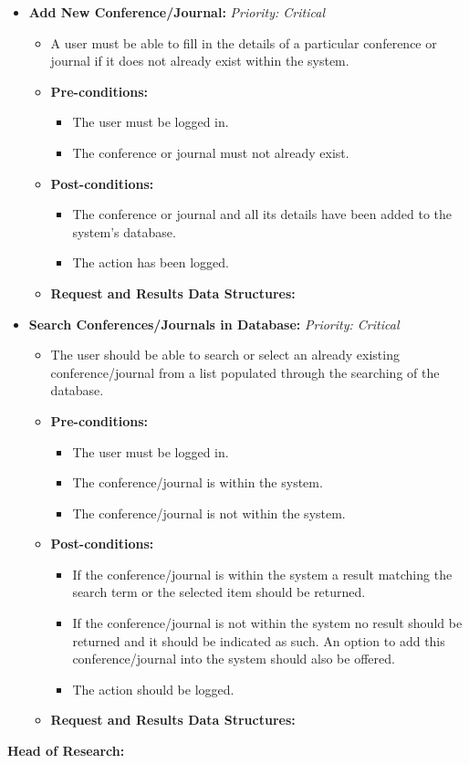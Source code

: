 \documentclass{article}
\begin{document}
\begin{itemize}
					\item \textbf{Add New Conference/Journal:} \hfill \textit{Priority: Critical}
					\begin{itemize}
						\item A user must be able to fill in the details of a particular conference or journal if it does not already exist within the system.
						\item \textbf{Pre-conditions:}
						\begin{itemize}
							\item The user must be logged in.
							\item The conference or journal must not already exist.
						\end{itemize}
						\item \textbf{Post-conditions:}
						\begin{itemize}
							\item The conference or journal and all its details have been added to the system's database.
							\item The action has been logged.
						\end{itemize}
						\item \textbf{Request and Results Data Structures:}
					\end{itemize}					
					
					\item \textbf{Search Conferences/Journals in Database:} \hfill \textit{Priority: Critical}
					\begin{itemize}
						\item The user should be able to search or select an already existing conference/journal from a list populated through the searching of the database.
						\item \textbf{Pre-conditions:}
						\begin{itemize}
							\item The user must be logged in.
							\item The conference/journal is within the system.
							\item The conference/journal is not within the system.
						\end{itemize}
						\item \textbf{Post-conditions:}
						\begin{itemize}
							\item If the conference/journal is within the system a result matching the search term or the selected item should be returned.
							\item If the conference/journal is not within the system no result should be returned and it should be indicated as such. An option to add this conference/journal into the system should also be offered.
							\item The action should be logged.
						\end{itemize}
						\item \textbf{Request and Results Data Structures:}
					\end{itemize}					
				\end{itemize}
				\textbf{Head of Research:}
				
\end{document}
